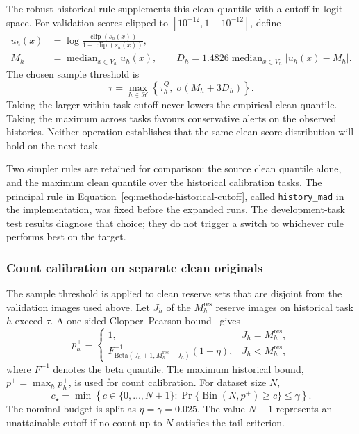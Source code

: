 The robust historical rule supplements this clean quantile with a cutoff
in logit space. For validation scores clipped to
$[10^{-12},1-10^{-12}]$, define
\begin{align}
    u_h(x)&=\log\frac{\operatorname{clip}(s_h(x))}
                              {1-\operatorname{clip}(s_h(x))},\\
    M_h&=\operatorname{median}_{x\in V_h}u_h(x),
    \qquad
    D_h=1.4826\operatorname{median}_{x\in V_h}|u_h(x)-M_h|.
    \label{eq:methods-mad}
\end{align}
The chosen sample threshold is
\begin{equation}
    \tau=\max_{h\in\mathcal{H}}
          \left\{\tau_h^{Q},\;\sigma(M_h+3D_h)\right\}.
    \label{eq:methods-historical-cutoff}
\end{equation}
Taking the larger within-task cutoff never lowers the empirical clean
quantile. Taking the maximum across tasks favours conservative alerts on
the observed histories. Neither operation establishes that the same clean
score distribution will hold on the next task.

Two simpler rules are retained for comparison: the source clean quantile
alone, and the maximum clean quantile over the historical calibration
tasks. The principal rule in Equation~\eqref{eq:methods-historical-cutoff},
called \texttt{history\_mad} in the implementation, was fixed before the
expanded runs. The development-task test results diagnose that choice;
they do not trigger a switch to whichever rule performs best on the target.

\subsubsection{Count calibration on separate clean originals}

The sample threshold is applied to clean reserve sets that are disjoint from
the validation images used above. Let $J_h$ of the $M_h^{\mathrm{res}}$
reserve images on historical task $h$ exceed $\tau$. A one-sided
Clopper--Pearson bound~\cite{clopper1934binomial} gives
\begin{equation}
    p_h^+=
    \begin{cases}
      1, & J_h=M_h^{\mathrm{res}},\\
      F_{\mathrm{Beta}(J_h+1,M_h^{\mathrm{res}}-J_h)}^{-1}(1-\eta),
          & J_h<M_h^{\mathrm{res}},
    \end{cases}
    \label{eq:methods-cp}
\end{equation}
where $F^{-1}$ denotes the beta quantile. The maximum historical bound,
$p^+=\max_h p_h^+$, is used for count calibration. For dataset size $N$,
\begin{equation}
    c_\star=\min\left\{c\in\{0,\ldots,N+1\}:
         \Pr\{\operatorname{Bin}(N,p^+)\geq c\}\leq\gamma\right\}.
    \label{eq:methods-critical-count}
\end{equation}
The nominal budget is split as $\eta=\gamma=0.025$. The value $N+1$
represents an unattainable cutoff if no count up to $N$ satisfies the tail
criterion.

